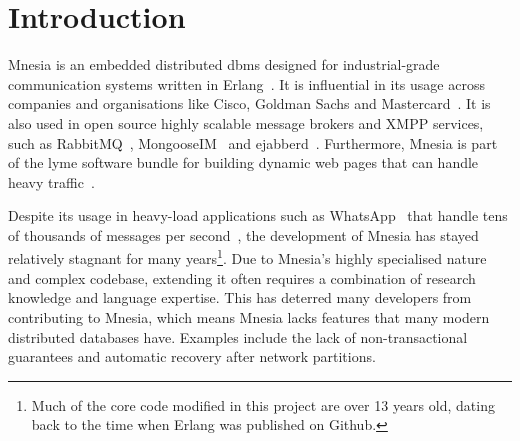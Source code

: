 \section{Introduction} \label{sec:intro}





Mnesia is an embedded distributed \acrfull{dbms} designed for industrial-grade
communication systems written in 
Erlang~\cite{ericssonab2023mnesiaguide,mattsson1998mnesia,mattsson1999mnesiainternal}. 
It is influential in its usage across companies and organisations like Cisco,
Goldman Sachs and Mastercard~\cite{cesarini2019erlang}.
It is also used in open source highly scalable message brokers and XMPP services, such as 
RabbitMQ~\cite{vmware2023rabbitmq}, MongooseIM~\cite{erlangsolutions2023MongooseIM} and 
ejabberd~\cite{processone2023ejabberd}. Furthermore, Mnesia is part of the \acrfull{lyme}
software bundle for building dynamic web pages that can handle heavy 
traffic~\cite{wikipediacontributors2020LYME}.

Despite its usage in heavy-load applications such as WhatsApp~\cite{vorontsov2018forgETS}
that handle tens of thousands of messages per second~\cite{levy2022RabbitMQvsKafka}, the development of Mnesia has stayed
relatively stagnant for many years\footnote{Much of the core code modified in this 
project are over 13 years old, dating back to the time when Erlang was published on Github.}.
Due to Mnesia's highly specialised nature and complex codebase, extending it often requires
a combination of research knowledge and language expertise. This has
deterred many developers from contributing to Mnesia,
which means Mnesia lacks features that many modern distributed databases have. 
Examples include the lack of non-transactional
guarantees and automatic recovery after network partitions.

